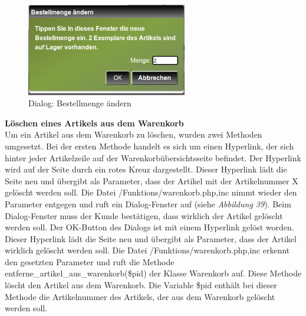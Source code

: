 \begin{figure}[H]
	\begin{center}
			\includegraphics[width=70mm]{Bilder/mengenaenderung.png}
	\end{center}
	\caption{Dialog: Bestellmenge ändern}
\end{figure}

\textbf{Löschen eines Artikels aus dem Warenkorb}\\
Um ein Artikel aus dem Warenkorb zu löschen, wurden zwei Methoden umgesetzt. Bei der ersten Methode handelt es sich um einen Hyperlink, der sich hinter jeder Artikelzeile auf der Warenkorbübersichtsseite befindet. Der Hyperlink wird auf der Seite durch ein rotes Kreuz dargestellt. Dieser Hyperlink lädt die Seite neu und übergibt als Parameter, dass der Artikel mit der Artikelnummer X gelöscht werden soll. Die Datei \glqq /Funktions/warenkorb.php,inc\grqq{} nimmt wieder den Parameter entgegen und ruft ein Dialog-Fenster auf (siehe \textit{Abbildung 39}). Beim Dialog-Fenster muss der Kunde bestätigen, dass wirklich der Artikel gelöscht werden soll. Der \glqq OK-Button\grqq{} des Dialogs ist mit einem Hyperlink gelöst worden. Dieser Hyperlink lädt die Seite neu und übergibt als Parameter, dass der Artikel wirklich gelöscht werden soll. Die Datei \glqq /Funktions/warenkorb.php,inc\grqq{} erkennt den gesetzten Parameter und ruft die Methode \glqq entferne\_artikel\_aus\_warenkorb(\$pid)\grqq{} der Klasse \glqq Warenkorb\grqq{} auf. Diese Methode löscht den Artikel aus dem Warenkorb. Die Variable \glqq \$pid\grqq{} enthält bei dieser Methode die Artikelnummer des Artikels, der aus dem Warenkorb gelöscht werden soll.\\
